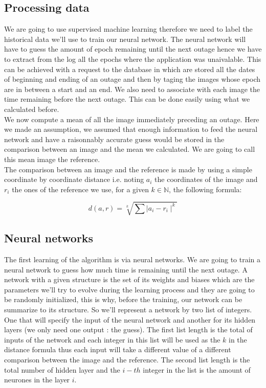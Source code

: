 \documentclass[10pt,a4paper,oneside]{article}
\begin{document}
\begin{multicols}{2}
\subsection{Processing data}
We are going to use supervised machine learning therefore we need to label the historical data we'll use to train our neural network. The neural network will have to guess the amount of epoch remaining until the next outage hence we have to extract from the log all the epochs where the application was unaivalable. This can be achieved with a request to the database in which are stored all the dates of beginning and ending of an outage and then by taging the images whose epoch are in between a start and an end.
 We also need to associate with each image the time remaining before the next outage. This can be done easily using what we calculated before.
\\We now compute a mean of all the image immediately preceding an outage. Here we made an assumption, we assumed that enough information to feed the neural network and have a raisonnably accurate guess would be stored in the comparison between an image and the mean we calculated. We are going to call this mean image the reference.
\\The comparison between an image and the reference is made by using a simple coordinate by coordinate distance i.e. noting $a_{i}$ the coordinates of the image and $r_{i}$ the ones of the reference we use, for a given $k\in\mathbb{N}$, the following formula:

\vspace{0.8cm}

\begin{Large}
\[ d(a, r) = \sqrt[k]{\sum \mid{a_i - r_i}\mid^{k}} \]
\end{Large}

\vspace{0.8cm}

\subsection{Neural networks}
The first learning of the algorithm is via neural networks. We are going to train a neural network to guess how much time is remaining until the next outage. A network with a given structure is the set of its weights and biases which are the parameters we'll try to evolve during the learning process and they are going to be randomly initialized, this is why, before the training, our network can be summarize to its structure. So we'll represent a network by two list of integers. One that will specify the input of the neural network and another for its hidden layers (we only need one output : the guess). The first list length is the total of inputs of the network and each integer in this list will be used as the $k$ in the distance formula thus each input will take a different value of a different comparison between the image and the reference. The second list length is the total number of hidden layer and the $i-th$ integer in the list is the amount of neurones in the layer $i$.
\end{multicols}
\end{document}
